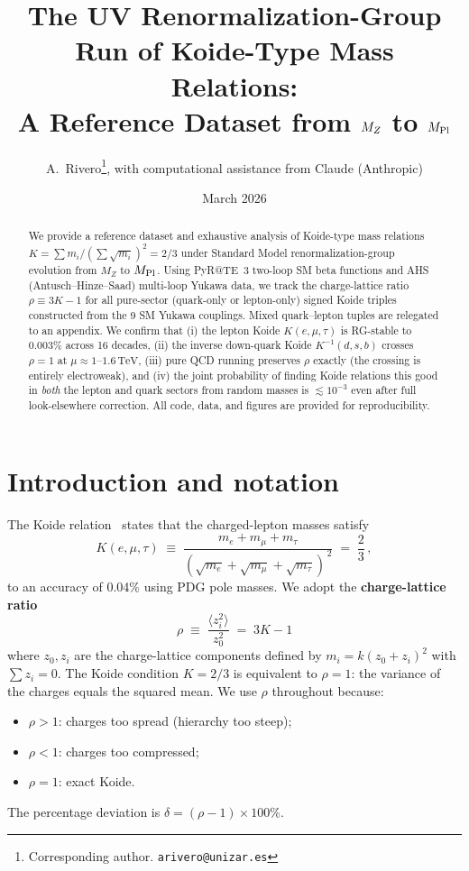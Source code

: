 \documentclass[11pt,a4paper]{article}
\title{The UV Renormalization-Group Run of Koide-Type Mass Relations:\\
A Reference Dataset from $\MZ$ to $\MPl$}
\author{A.~Rivero\thanks{Corresponding author. \texttt{arivero@unizar.es}},
  with computational assistance from Claude (Anthropic)}
\date{March 2026}
\newcommand{\TeV}{\,\text{TeV}}
\newcommand{\MZ}{M_Z}
\newcommand{\MPl}{M_{\rm Pl}}
\begin{document}
\maketitle

\begin{abstract}
We provide a reference dataset and exhaustive analysis of Koide-type
mass relations $K = \sum m_i / (\sum \sqrt{m_i})^2 = 2/3$ under
Standard Model renormalization-group evolution from $\MZ$ to $\MPl$.
Using PyR@TE~3 two-loop SM beta functions and AHS (Antusch--Hinze--Saad)
multi-loop Yukawa data, we track the charge-lattice ratio
$\rho \equiv 3K - 1$ for all pure-sector (quark-only or lepton-only)
signed Koide triples constructed from the 9 SM Yukawa couplings.
Mixed quark--lepton tuples are relegated to an appendix. We confirm that (i) the lepton Koide $K(e,\mu,\tau)$ is
RG-stable to 0.003\% across 16 decades, (ii) the inverse down-quark
Koide $K^{-1}(d,s,b)$ crosses $\rho = 1$ at $\mu \approx 1$--$1.6\TeV$,
(iii) pure QCD running preserves $\rho$ exactly (the crossing is
entirely electroweak), and (iv) the joint probability of finding
Koide relations this good in \emph{both} the lepton and quark sectors
from random masses is $\lesssim 10^{-3}$ even after full look-elsewhere
correction. All code, data, and figures are provided for reproducibility.
\end{abstract}

\section{Introduction and notation}
\label{sec:intro}

The Koide relation~\cite{Koide:1982} states that the charged-lepton
masses satisfy
\begin{equation}
  K(e,\mu,\tau) \;\equiv\;
  \frac{m_e + m_\mu + m_\tau}
       {(\sqrt{m_e} + \sqrt{m_\mu} + \sqrt{m_\tau})^{\,2}}
  \;=\; \frac{2}{3}\,,
  \label{eq:koide}
\end{equation}
to an accuracy of 0.04\% using PDG pole masses. We adopt the
\textbf{charge-lattice ratio}
\begin{equation}
  \boxed{\;\rho \;\equiv\; \frac{\langle z_i^2\rangle}{z_0^2}
         \;=\; 3K - 1\;}
  \label{eq:rho}
\end{equation}
where $z_0, z_i$ are the charge-lattice components defined by
$m_i = k(z_0 + z_i)^2$ with $\sum z_i = 0$. The Koide condition
$K = 2/3$ is equivalent to $\rho = 1$: the variance of the charges
equals the squared mean. We use $\rho$ throughout because:
\begin{itemize}
\item $\rho > 1$: charges too spread (hierarchy too steep);
\item $\rho < 1$: charges too compressed;
\item $\rho = 1$: exact Koide.
\end{itemize}
The percentage deviation is $\delta = (\rho - 1) \times 100\%$.
\end{document}
